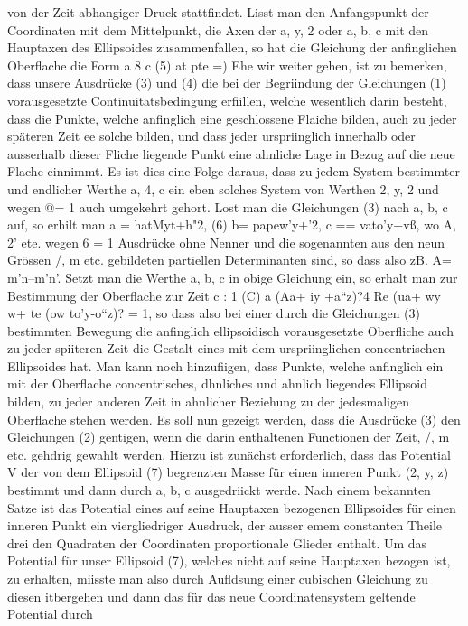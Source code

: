 \documentclass[11pt]{article}
\begin{document}
von der Zeit abhangiger Druck stattfindet. Lisst man den Anfangspunkt der Coordinaten
mit dem Mittelpunkt, die Axen der a, y, 2 oder a, b, c mit den Hauptaxen des Ellipsoides
zusammenfallen, so hat die Gleichung der anfinglichen Oberflache die Form a 8 c (5) at
pte =) Ehe wir weiter gehen, ist zu bemerken, dass unsere Ausdrücke (3) und (4)
die bei der Begriindung der Gleichungen (1) vorausgesetzte Continuitatsbedingung
erfiillen, welche wesentlich darin besteht, dass die Punkte, welche anfinglich eine geschlossene Flaiche bilden, auch zu jeder späteren Zeit ee solche bilden, und dass jeder urspriinglich innerhalb oder ausserhalb dieser Fliche liegende Punkt eine ahnliche Lage in Bezug
auf die neue Flache einnimmt. Es ist dies eine Folge daraus, dass zu jedem System bestimmter und endlicher Werthe a, 4, c ein eben solches System von Werthen 2, y, 2 und
wegen @= 1 auch umgekehrt gehort. Lost man die Gleichungen (3) nach a, b, c auf, so erhilt man a = hatMyt+h"2, (6) b= papew’y+’2, c == vato’y+vß, wo A, 2’ ete. wegen 6 =
1 Ausdrücke ohne Nenner und die sogenannten aus den neun Grössen /, m etc. gebildeten
partiellen Determinanten sind, so dass also zB. A= m’n–m’n’. Setzt man die Werthe a, b,
c in obige Gleichung ein, so erhalt man zur Bestimmung der Oberflache zur Zeit c : 1 (C)
a (Aa+ iy +a“z)?4 Re (ua+ wy w+ te (ow to’y-o“z)? = 1, so dass also bei einer durch die
Gleichungen (3) bestimmten Bewegung die anfinglich ellipsoidisch vorausgesetzte Oberfliche auch zu jeder spiiteren Zeit die Gestalt eines mit dem urspriinglichen concentrischen
Ellipsoides hat. Man kann noch hinzufiigen, dass Punkte, welche anfinglich ein mit der
Oberflache concentrisches, dhnliches und ahnlich liegendes Ellipsoid bilden, zu jeder anderen Zeit in ahnlicher Beziehung zu der jedesmaligen Oberflache stehen werden. Es soll
nun gezeigt werden, dass die Ausdrücke (3) den Gleichungen (2) gentigen, wenn die darin
enthaltenen Functionen der Zeit, /, m etc. gehdrig gewahlt werden. Hierzu ist zunächst
erforderlich, dass das Potential V der von dem Ellipsoid (7) begrenzten Masse für einen
inneren Punkt (2, y, z) bestimmt und dann durch a, b, c ausgedriickt werde. Nach einem bekannten Satze ist das Potential eines auf seine Hauptaxen bezogenen Ellipsoides
für einen inneren Punkt ein viergliedriger Ausdruck, der ausser emem constanten Theile
drei den Quadraten der Coordinaten proportionale Glieder enthalt. Um das Potential für
unser Ellipsoid (7), welches nicht auf seine Hauptaxen bezogen ist, zu erhalten, miisste
man also durch Aufldsung einer cubischen Gleichung zu diesen
itbergehen und dann das für das neue Coordinatensystem geltende Potential durch
\end{document}
